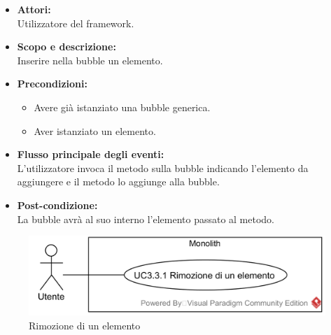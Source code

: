 \begin{itemize}
	\item \textbf{Attori:}
	\\Utilizzatore del framework.
	\item \textbf{Scopo e descrizione:} 
	\\Inserire nella bubble un elemento.
	\item \textbf{Precondizioni:}
	\begin{itemize}
		\item Avere già istanziato una bubble generica.
		\item Aver istanziato un elemento.
	\end{itemize}
	\item \textbf{Flusso principale degli eventi:}
	\\L'utilizzatore invoca il metodo sulla bubble indicando l'elemento da aggiungere e il metodo lo aggiunge alla bubble.
	\item \textbf{Post-condizione:}
	\\La bubble avrà al suo interno l'elemento passato al metodo.
\end{itemize}

\begin{samepage}
\isfirsttrue
{}
\nopagebreak
\begin{figure}[H]
	\centering
	\includegraphics[width=15cm]{../../documenti/AnalisiDeiRequisiti/Diagrammi_img/usecase/uc1_03.png}
	\caption{\UCCCaption{} Rimozione di un elemento}
\end{figure}
\end{samepage}

